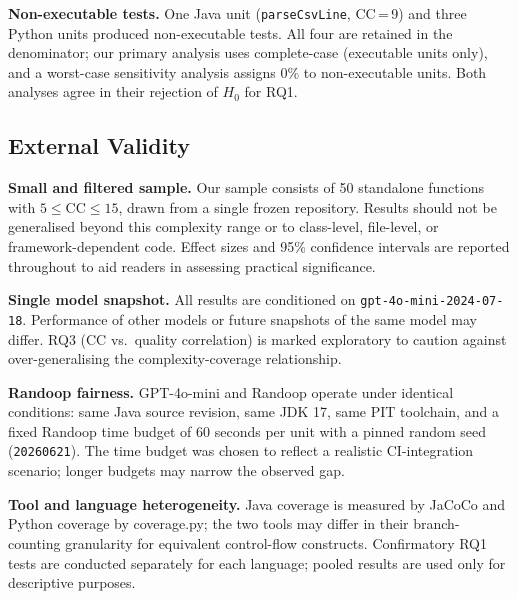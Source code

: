 \textbf{Non-executable tests.}
One Java unit (\texttt{parseCsvLine}, CC\,=\,9) and three Python units produced
non-executable tests.
All four are retained in the denominator; our primary analysis uses complete-case
(executable units only), and a worst-case sensitivity analysis assigns 0\% to
non-executable units.
Both analyses agree in their rejection of $H_0$ for RQ1.

\subsection{External Validity}

\textbf{Small and filtered sample.}
Our sample consists of 50 standalone functions with $5 \le \text{CC} \le 15$,
drawn from a single frozen repository.
Results should not be generalised beyond this complexity range or to
class-level, file-level, or framework-dependent code.
Effect sizes and 95\% confidence intervals are reported throughout to aid
readers in assessing practical significance.

\textbf{Single model snapshot.}
All results are conditioned on \texttt{gpt-4o-mini-2024-07-18}.
Performance of other models or future snapshots of the same model may differ.
RQ3 (CC vs.\ quality correlation) is marked exploratory to caution against
over-generalising the complexity-coverage relationship.

\textbf{Randoop fairness.}
GPT-4o-mini and Randoop operate under identical conditions: same Java source
revision, same JDK 17, same PIT toolchain, and a fixed Randoop time budget
of 60 seconds per unit with a pinned random seed (\texttt{20260621}).
The time budget was chosen to reflect a realistic CI-integration scenario;
longer budgets may narrow the observed gap.

\textbf{Tool and language heterogeneity.}
Java coverage is measured by JaCoCo and Python coverage by coverage.py;
the two tools may differ in their branch-counting granularity for equivalent
control-flow constructs.
Confirmatory RQ1 tests are conducted separately for each language; pooled results
are used only for descriptive purposes.
